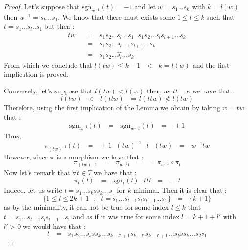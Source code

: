 \documentclass[envcountsame,envcountchap]{svmono}
\newcommand{\qq}{\text{ }}
\begin{document}
\begin{proof}
	Let's suppose that $\mbox{sgn}_{w^{-1}}(t)=-1$ and let $w=s_1...s_k$ with $k=l(w)$ then $w^{-1}=s_k...s_1$. We know that there must exists some $1\leq l\leq k$ such that $t=s_1...s_l..s_1$ but then :
	\begin{equation}
	\begin{split}
	tw\qq&=\qq s_1s_2...s_l...s_1\qq s_1s_2...s_ls_{l+1}...s_k\\
	&=\qq s_1s_2...s_{l-1}s_{l+1}...s_k\\
	&=\qq s_1s_2...\hat{s_l}...s_k
	\end{split}
	\end{equation}
	From which we conclude that $l(tw)\leq k-1\qq <\qq k=l(w)$ and the first implication is proved.
	
	Conversely, let's suppose that $l(tw)<l(w)$ then, as $tt=e$ we have that :
	\begin{equation}
	l(tw)\qq <\qq l(ttw)\qq \Rightarrow l(ttw)\not<l(tw) 
	\end{equation} 
	Therefore, using the first implication of the Lemma we obtain by taking $\tilde{w}=tw$ that :
	\begin{equation}
	\mbox{sgn}_{\tilde{w}^{-1}}(t)\qq=\qq \mbox{sgn}_{w^{-1}t}(t)\qq =\qq+1
	\end{equation}
	Thus, 
	\begin{equation}
	\pi_{(tw)^{-1}}(t)\qq=\qq +1 \qq (tw)^{-1}\qq t\qq(tw)\qq=\qq w^{-1}tw
	\end{equation}
	However, since $\pi$ is a morphism we have that :
	\begin{equation}\label{pi est un homo}
	\pi_{(tw){-1}}\qq=\qq\pi_{w^{-1}t}\qq=\qq =\pi_{w^{-1}}\circ\pi_t
	\end{equation}
	Now let's remark that $\forall t\in T$ we have that :
	\begin{equation}
	\pi_t(t)\qq=\qq \mbox{sgn}_t(t)\qq ttt\qq=\qq -t
	\end{equation}
	Indeed, let us write $t=s_1...s_kss_k...s_1$ for $k$ minimal. Then it is clear that :
	\begin{equation}\label{le signe de t de t}
	\{1\leq l\leq 2k+1\qq :\qq t=s_1...s_{l-1}s_l s_{l-1}...s_1\}\qq=\qq \{k+1\}
	\end{equation}
	as by the minimality, it can not be true for some index $l\leq k$ that $t=s_1...s_{l-1}s_l s_{l-1}...s_1$ and as if it was true for some index $l= k+1+l'$ with $l'>0$ we would have that  :
	\begin{equation}
	t\qq=\qq s_1s_2...s_kss_k...s_{k-l'+1}s_{k-l'}s_{k-l'+1}...s_kss_k...s_2s_1

\end{equation}
\end{proof}
\end{document}
